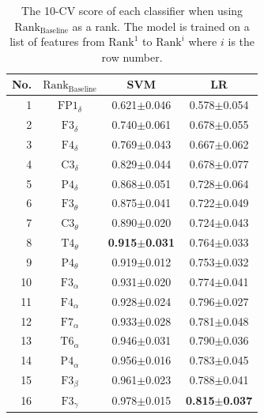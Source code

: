 \documentclass[pdflatex,sn-mathphys]{sn-jnl}%
\theoremstyle{thmstyleone}%
\theoremstyle{thmstyletwo}%
\theoremstyle{thmstylethree}%
\begin{document}
\begin{table}[h!]
\centering
\caption{The 10-CV score of each classifier when using $\text{Rank}_{\text{Baseline}}$ as a rank. The model is trained on a list of features from $\text{Rank}^1$ to $\text{Rank}^i$ where $i$ is the row number. }
\label{tab:cv_baseline}
\begin{tabular}{r|ccc}
\hline
 No. & $\text{Rank}_{\text{Baseline}}$ &                      SVM &                       LR \\
\hline
   1 &           $\text{FP1}_{\delta}$ &          0.621$\pm$0.046 &          0.578$\pm$0.054 \\
   2 &            $\text{F3}_{\delta}$ &          0.740$\pm$0.061 &          0.678$\pm$0.055 \\
   3 &            $\text{F4}_{\delta}$ &          0.769$\pm$0.043 &          0.667$\pm$0.062 \\
   4 &            $\text{C3}_{\delta}$ &          0.829$\pm$0.044 &          0.678$\pm$0.077 \\
   5 &            $\text{P4}_{\delta}$ &          0.868$\pm$0.051 &          0.728$\pm$0.064 \\
   6 &            $\text{F3}_{\theta}$ &          0.875$\pm$0.041 &          0.722$\pm$0.049 \\
   7 &            $\text{C3}_{\theta}$ &          0.890$\pm$0.020 &          0.724$\pm$0.043 \\
   8 &            $\text{T4}_{\theta}$ & \textbf{0.915$\pm$0.031} &          0.764$\pm$0.033 \\
   9 &            $\text{P4}_{\theta}$ &          0.919$\pm$0.012 &          0.753$\pm$0.032 \\
  10 &            $\text{F3}_{\alpha}$ &          0.931$\pm$0.020 &          0.774$\pm$0.041 \\
  11 &            $\text{F4}_{\alpha}$ &          0.928$\pm$0.024 &          0.796$\pm$0.027 \\
  12 &            $\text{F7}_{\alpha}$ &          0.933$\pm$0.028 &          0.781$\pm$0.048 \\
  13 &            $\text{T6}_{\alpha}$ &          0.946$\pm$0.031 &          0.790$\pm$0.036 \\
  14 &            $\text{P4}_{\alpha}$ &          0.956$\pm$0.016 &          0.783$\pm$0.045 \\
  15 &             $\text{F3}_{\beta}$ &          0.961$\pm$0.023 &          0.788$\pm$0.041 \\
  16 &            $\text{F3}_{\gamma}$ &          0.978$\pm$0.015 & \textbf{0.815$\pm$0.037} \\

\end{tabular}
\end{table}
\end{document}
